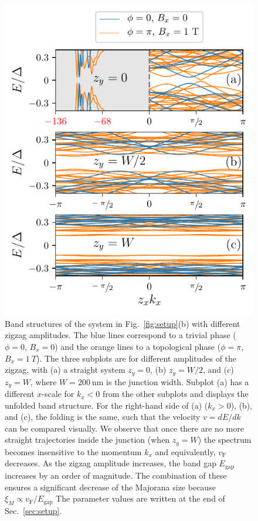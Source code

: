 \documentclass[english, twocolumn, 10pt, aps, superscriptaddress, floatfix, prb, citeautoscript]{revtex4-1}
\begin{document}
\begin{figure}[!htb]
\includegraphics[width=\columnwidth]{figures/bandstructures}
\caption{Band structures of the system in Fig.~\ref{fig:setup}(b) with different zigzag amplitudes.
The blue lines correspond to a trivial phase ($\phi=0$, $B_x = 0$) and the orange lines to a topological phase ($\phi=\pi$, $B_x = \SI{1}{T}$).
The three subplots are for different amplitudes of the zigzag, with (a) a straight system $z_y=0$, (b) $z_y=W/2$, and (c) $z_y=W$, where $W=\SI{200}{\nm}$ is the junction width.
Subplot (a) has a different $x$-scale for $k_x < 0$ from the other subplots and displays the unfolded band structure.
For the right-hand side of (a) ($k_x > 0$), (b), and (c), the folding is the same, such that the velocity $v=dE/dk$ can be compared visually.
We observe that once there are no more straight trajectories inside the junction (when $z_y=W$) the spectrum becomes insensitive to the momentum $k_x$ and equivalently, $v_\textrm{F}$ decreases.
As the zigzag amplitude increases, the band gap $E_\textrm{gap}$ increases by an order of magnitude.
The combination of these ensures a significant decrease of the Majorana size because $\xi_M \propto v_\textrm{F}/E_\textrm{gap}$
The parameter values are written at the end of Sec.~\ref{sec:setup}.\label{fig:band_structures}}
\end{figure}
\end{document}
